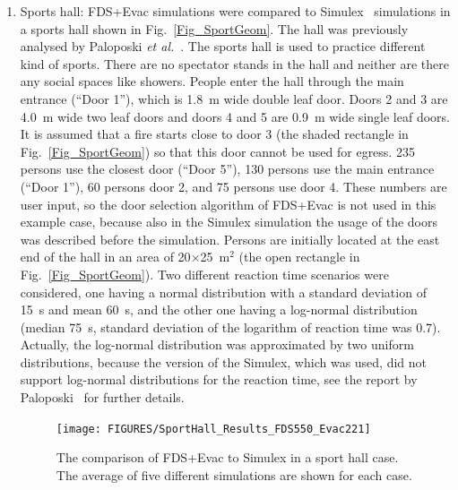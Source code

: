 \documentclass[12pt,a4paper,final,twoside]{stylevk}
\begin{document}
\begin{enumerate}
%
\item Sports hall: FDS+Evac simulations were compared to
  Simulex~\cite{Simulex96, Thompson95a, Thompson95b, Thompson03}
  simulations in a sports hall shown in Fig.~\ref{Fig_SportGeom}.
  The hall was previously analysed by Paloposki \emph{et
    al.}~\cite{Paloposki02}.  The sports hall is used to practice
  different kind of sports.  There are no spectator stands in the hall
  and neither are there any social spaces like showers.  People enter
  the hall through the main entrance (``Door 1''), which is 1.8~m wide
  double leaf door.  Doors 2 and 3 are 4.0~m wide two leaf doors and
  doors 4 and 5 are 0.9~m wide single leaf doors.  It is assumed that
  a fire starts close to door 3 (the shaded rectangle in
  Fig.~\ref{Fig_SportGeom}) so that this door cannot be used for
  egress.  235 persons use the closest door (``Door 5''), 130 persons
  use the main entrance (``Door 1''), 60 persons door 2, and 75
  persons use door 4.  These numbers are user input, so the door
  selection algorithm of FDS+Evac is not used in this example case,
  because also in the Simulex simulation the usage of the doors was
  described before the simulation.  Persons are initially located at
  the east end of the hall in an area of 20$\times$25~$\mathrm{m^2}$
  (the open rectangle in Fig.~\ref{Fig_SportGeom}).  Two different
  reaction time scenarios were considered, one having a normal
  distribution with a standard deviation of 15~s and mean 60~s, and
  the other one having a log-normal distribution (median 75~s,
  standard deviation of the logarithm of reaction time was 0.7).
  Actually, the log-normal distribution was approximated by two
  uniform distributions, because the version of the Simulex, which was
  used, did not support log-normal distributions for the reaction
  time, see the report by Paloposki~\cite{Paloposki02} for further
  details.

  \begin{figure}[!tb]
    \centerline{\texttt{[image: FIGURES/SportHall\_Results\_FDS550\_Evac221]}}
    \caption{The comparison of FDS+Evac to Simulex in a sport hall
      case.  The average of five different simulations are shown for
      each case.}\label{Fig_SportResults}
  \end{figure}


\end{enumerate}
\end{document}
